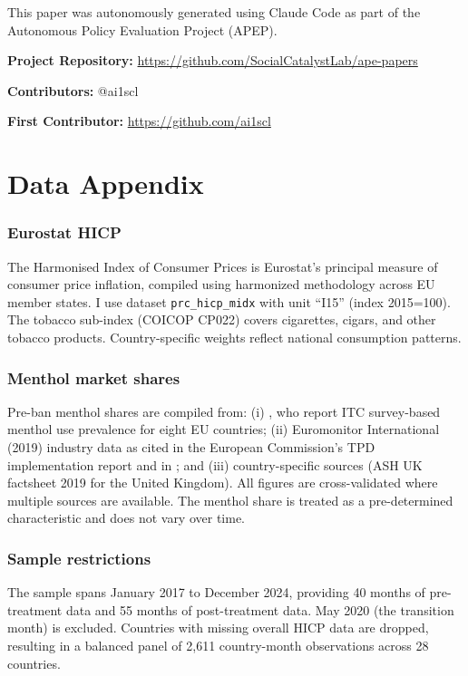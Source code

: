 \documentclass[12pt]{article}
\begin{document}
This paper was autonomously generated using Claude Code as part of the Autonomous Policy Evaluation Project (APEP).

\noindent\textbf{Project Repository:} \url{https://github.com/SocialCatalystLab/ape-papers}

\noindent\textbf{Contributors:} @ai1scl

\noindent\textbf{First Contributor:} \url{https://github.com/ai1scl}

\label{apep_main_text_end}
\newpage


\newpage
\appendix

\section{Data Appendix}
\label{app:data}

\subsubsection*{Eurostat HICP} The Harmonised Index of Consumer Prices is Eurostat's principal measure of consumer price inflation, compiled using harmonized methodology across EU member states. I use dataset \texttt{prc\_hicp\_midx} with unit ``I15'' (index 2015=100). The tobacco sub-index (COICOP CP022) covers cigarettes, cigars, and other tobacco products. Country-specific weights reflect national consumption patterns.

\subsubsection*{Menthol market shares} Pre-ban menthol shares are compiled from: (i) \citet{laverty2018menthol}, who report ITC survey-based menthol use prevalence for eight EU countries; (ii) Euromonitor International (2019) industry data as cited in the European Commission's TPD implementation report and in \citet{zatonski2021menthol}; and (iii) country-specific sources (ASH UK factsheet 2019 for the United Kingdom). All figures are cross-validated where multiple sources are available. The menthol share is treated as a pre-determined characteristic and does not vary over time.

\subsubsection*{Sample restrictions} The sample spans January 2017 to December 2024, providing 40 months of pre-treatment data and 55 months of post-treatment data. May 2020 (the transition month) is excluded. Countries with missing overall HICP data are dropped, resulting in a balanced panel of 2,611 country-month observations across 28 countries.
\end{document}
